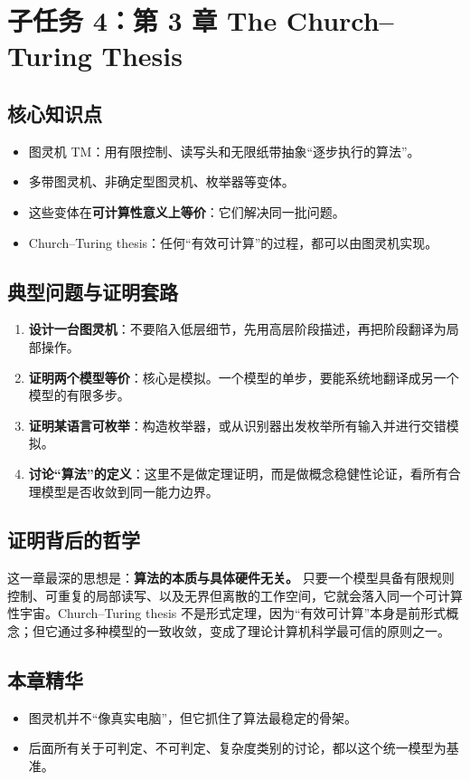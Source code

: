 \section{子任务 4：第 3 章 The Church--Turing Thesis}

\subsection{核心知识点}

\begin{itemize}[leftmargin=2em]
  \item 图灵机 TM：用有限控制、读写头和无限纸带抽象“逐步执行的算法”。
  \item 多带图灵机、非确定型图灵机、枚举器等变体。
  \item 这些变体在\textbf{可计算性意义上等价}：它们解决同一批问题。
  \item Church--Turing thesis：任何“有效可计算”的过程，都可以由图灵机实现。
\end{itemize}

\subsection{典型问题与证明套路}

\begin{enumerate}[leftmargin=2em]
  \item \textbf{设计一台图灵机}：不要陷入低层细节，先用高层阶段描述，再把阶段翻译为局部操作。
  \item \textbf{证明两个模型等价}：核心是模拟。一个模型的单步，要能系统地翻译成另一个模型的有限多步。
  \item \textbf{证明某语言可枚举}：构造枚举器，或从识别器出发枚举所有输入并进行交错模拟。
  \item \textbf{讨论“算法”的定义}：这里不是做定理证明，而是做概念稳健性论证，看所有合理模型是否收敛到同一能力边界。
\end{enumerate}

\subsection{证明背后的哲学}

这一章最深的思想是：\textbf{算法的本质与具体硬件无关。}
只要一个模型具备有限规则控制、可重复的局部读写、以及无界但离散的工作空间，它就会落入同一个可计算性宇宙。Church--Turing thesis 不是形式定理，因为“有效可计算”本身是前形式概念；但它通过多种模型的一致收敛，变成了理论计算机科学最可信的原则之一。

\subsection{本章精华}

\begin{itemize}[leftmargin=2em]
  \item 图灵机并不“像真实电脑”，但它抓住了算法最稳定的骨架。
  \item 后面所有关于可判定、不可判定、复杂度类别的讨论，都以这个统一模型为基准。
\end{itemize}

\newpage
